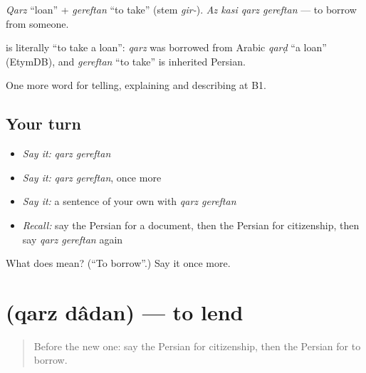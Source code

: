 \emph{Qarz} \textquotedblleft{}loan\textquotedblright{} + \emph{gereftan} \textquotedblleft{}to take\textquotedblright{} (stem \emph{gir-}). \emph{Az kasi qarz gereftan} — to borrow from someone.

\begin{cousinweb}
\textbf{ } is literally \textquotedblleft{}to take a loan\textquotedblright{}: \emph{qarz} was borrowed from Arabic \emph{qarḍ} \textquotedblleft{}a loan\textquotedblright{} (EtymDB), and \emph{gereftan} \textquotedblleft{}to take\textquotedblright{} is inherited Persian.
\end{cousinweb}

\begin{grammarlens}[title={What you've built}]
One more word for telling, explaining and describing at B1.
\end{grammarlens}

\subsection*{Your turn}
\begin{itemize}
\raggedright
  \item \emph{Say it:} \emph{qarz gereftan}
  \item \emph{Say it:} \emph{qarz gereftan}, once more
  \item \emph{Say it:} a sentence of your own with \emph{qarz gereftan}
  \item \emph{Recall:} say the Persian for a document, then the Persian for citizenship, then say \emph{qarz gereftan} again
\end{itemize}

\begin{tcolorbox}[breakable,colback=teal!4,colframe=teal!35!black,title={Before you move on}]
What does   mean? (\textquotedblleft{}To borrow\textquotedblright{}.) Say it once more.
\end{tcolorbox}
\section[\texorpdfstring{\fa{قرض} \fa{دادن} (qarz dâdan)}{قرض دادن (qarz dâdan)}]{  (qarz dâdan) — to lend}

\label{lesson:FA-C411-qarz-dadan}



\begin{quote}
Before the new one: say the Persian for citizenship, then the Persian for to borrow.
\end{quote}

